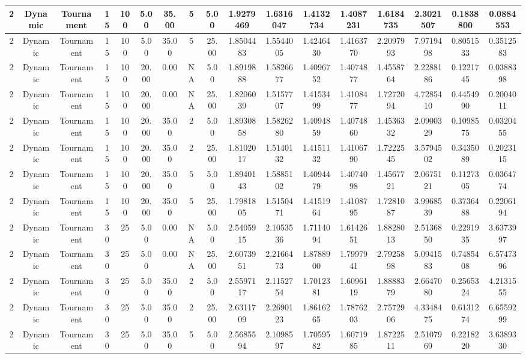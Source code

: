 \documentclass[a4paper]{article}
\begin{document}
\begin{center}
\begin{tabular}{ | c | c | c | c | c | c | c | c | c | c | c | c | c | c | c | c | c | }
		\hline
		2	&	Dynamic	&	Tournament	&	15	&	100	&	5.00	&	35.00	&	5	&	5.00	&	1.9279469	&	1.6316047	&	1.4132734	&	1.4087231	&	1.6184735	&	2.3021507	&	0.1838800	&	0.0884553 \\
		\hline
		2	&	Dynamic	&	Tournament	&	15	&	100	&	5.00	&	35.00	&	5	&	25.00	&	1.8504483	&	1.5544005	&	1.4246430	&	1.4163770	&	2.2097993	&	7.9719498	&	0.8051533	&	0.3512583 \\
		\hline
		2	&	Dynamic	&	Tournament	&	15	&	100	&	20.00	&	0.00	&	NA	&	5.00	&	1.8919888	&	1.5826677	&	1.4096752	&	1.4074877	&	1.4558764	&	2.2288186	&	0.1221745	&	0.0388398 \\
		\hline
		2	&	Dynamic	&	Tournament	&	15	&	100	&	20.00	&	0.00	&	NA	&	25.00	&	1.8206039	&	1.5157707	&	1.4153499	&	1.4108477	&	1.7272094	&	4.7285410	&	0.4454990	&	0.2004011 \\
		\hline
		2	&	Dynamic	&	Tournament	&	15	&	100	&	20.00	&	35.00	&	2	&	5.00	&	1.8930858	&	1.5826280	&	1.4094859	&	1.4074860	&	1.4536332	&	2.0900329	&	0.1098575	&	0.0320455 \\
		\hline
		2	&	Dynamic	&	Tournament	&	15	&	100	&	20.00	&	35.00	&	2	&	25.00	&	1.8102017	&	1.5140132	&	1.4151132	&	1.4106790	&	1.7222545	&	3.5794502	&	0.3435089	&	0.2023115 \\
		\hline
		2	&	Dynamic	&	Tournament	&	15	&	100	&	20.00	&	35.00	&	5	&	5.00	&	1.8940143	&	1.5885102	&	1.4094479	&	1.4074098	&	1.4567721	&	2.0675121	&	0.1127305	&	0.0364774 \\
		\hline
		2	&	Dynamic	&	Tournament	&	15	&	100	&	20.00	&	35.00	&	5	&	25.00	&	1.7981805	&	1.5150471	&	1.4151964	&	1.4108795	&	1.7281087	&	3.9968539	&	0.3736488	&	0.2206194 \\
		\hline
		2	&	Dynamic	&	Tournament	&	30	&	25	&	5.00	&	0.00	&	NA	&	5.00	&	2.5405915	&	2.1053536	&	1.7114094	&	1.6142651	&	1.8828013	&	2.5136850	&	0.2291935	&	3.6373997 \\
		\hline
		2	&	Dynamic	&	Tournament	&	30	&	25	&	5.00	&	0.00	&	NA	&	25.00	&	2.6073951	&	2.2166473	&	1.8788900	&	1.7997941	&	2.7925898	&	5.0941583	&	0.7485408	&	6.5747396 \\
		\hline
		2	&	Dynamic	&	Tournament	&	30	&	25	&	5.00	&	35.00	&	2	&	5.00	&	2.5597117	&	2.1152754	&	1.7012381	&	1.6096119	&	1.8888379	&	2.6647080	&	0.2565324	&	4.2131555 \\
		\hline
		2	&	Dynamic	&	Tournament	&	30	&	25	&	5.00	&	35.00	&	2	&	25.00	&	2.6311709	&	2.2690123	&	1.8616265	&	1.7876203	&	2.7572906	&	4.3348475	&	0.6131274	&	6.6559299 \\
		\hline
		2	&	Dynamic	&	Tournament	&	30	&	25	&	5.00	&	35.00	&	5	&	5.00	&	2.5685594	&	2.1098597	&	1.7059582	&	1.6071985	&	1.8722511	&	2.5107969	&	0.2218220	&	3.6389330 \\

\end{tabular}
\end{center}
\end{document}

